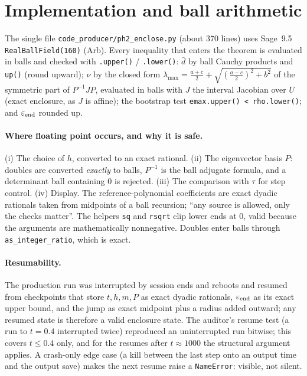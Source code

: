 \documentclass[11pt]{article}
\theoremstyle{remark}
\begin{document}
\section{Implementation and ball arithmetic}\label{sec:impl}
The single file \texttt{code\_producer/ph2\_enclose.py} (about 370 lines) uses Sage~9.5 \texttt{RealBallField(160)} (Arb). Every inequality that enters the theorem is evaluated in balls and checked with \texttt{.upper()} / \texttt{.lower()}: $\bar d$ by ball Cauchy products and \texttt{up()} (round upward); $\nu$ by the closed form $\lambda_{\max}=\tfrac{a+c}2+\sqrt{(\tfrac{a-c}2)^2+b^2}$ of the symmetric part of $P^{-1}JP$, evaluated in balls with $J$ the interval Jacobian over $U$ (exact enclosure, as $J$ is affine); the bootstrap test \texttt{emax.upper() < rho.lower()}; and $\varepsilon_{\rm end}$ rounded up.
\paragraph{Where floating point occurs, and why it is safe.} (i) The choice of $h$, converted to an exact rational. (ii) The eigenvector basis $P$: doubles are converted \emph{exactly} to balls, $P^{-1}$ is the ball adjugate formula, and a determinant ball containing $0$ is rejected. (iii) The comparison with $\tau$ for step control. (iv) Display. The reference-polynomial coefficients are exact dyadic rationals taken from midpoints of a ball recursion; ``any source is allowed, only the checks matter''. The helpers \texttt{sq} and \texttt{rsqrt} clip lower ends at $0$, valid because the arguments are mathematically nonnegative. Doubles enter balls through \texttt{as\_integer\_ratio}, which is exact.
\paragraph{Resumability.} The production run was interrupted by session ends and reboots and resumed from checkpoints that store $t,h,m,P$ as exact dyadic rationals, $\varepsilon_{\rm end}$ as its exact upper bound, and the jump as exact midpoint plus a radius added outward; any resumed state is therefore a valid enclosure state. The auditor's resume test (a run to $t=0.4$ interrupted twice) reproduced an uninterrupted run bitwise; this covers $t\le0.4$ only, and for the resumes after $t\approx1000$ the structural argument applies. A crash-only edge case (a kill between the last step onto an output time and the output save) makes the next resume raise a \texttt{NameError}: visible, not silent.
\end{document}
